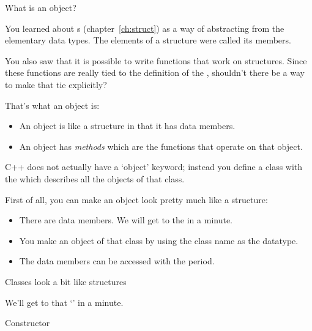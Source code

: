 
 {What is an object?}
\label{sec:object}

You learned about s (chapter~\ref{ch:struct}) as a way of
abstracting from the elementary data types. The elements of a
structure were called its members.

You also saw that it is possible to write
functions that work on structures. Since these functions are really
tied to the definition of the , shouldn't there be a way to
make that tie explicitly?

That's what an object is:
\begin{itemize}
\item An object is like a structure in that it has data members.
\item An object has \emph{methods} which
  are the functions that operate on that object.
\end{itemize}
C++ does not actually have a `object' keyword; instead you define a
class with the  which describes all the objects
of that class.

First of all, you can make an object look pretty much like a
structure:
%

\begin{itemize}
\item There are data members. We will get to the  in a
  minute.
\item You make an object of that class by using the class name as the
  datatype.
\item The data members can be accessed with the period.
\end{itemize}

\begin{slide}{Classes look a bit like structures}
  \label{sl:class-struct}

  We'll get to that `' in a minute.
\end{slide}

 {Constructor}

